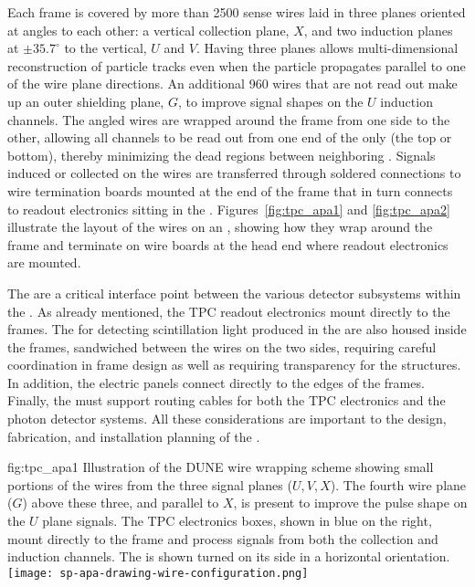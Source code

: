Each  frame is covered by more than \num{2500} sense wires laid in three planes  oriented at angles to each other: a vertical collection plane, $X$, and two induction planes at $\pm35.7^\circ$ to the vertical, $U$ and $V$. Having three planes allows multi-dimensional reconstruction of particle tracks even when the particle propagates parallel to one of the wire plane directions.  An additional \num{960} wires that are not read out make up an outer shielding plane, $G$, to improve signal shapes on the $U$ induction channels.  The angled wires are wrapped around the frame from one side to the other, allowing all channels to be read out from one end of the  only (the top or bottom), thereby minimizing the dead regions between neighboring . Signals induced or collected on the wires are transferred through soldered connections to wire termination boards mounted at the end of the  frame that in turn connects to  readout electronics sitting in the \lar.  Figures~\ref{fig:tpc_apa1} and \ref{fig:tpc_apa2} illustrate the layout of the wires on an , showing how they wrap around the frame and terminate on wire boards at the head end where readout electronics are mounted.

The  are a critical interface point between the various detector subsystems within the .  As already mentioned, the TPC readout electronics mount directly to the  frames.  The  for detecting scintillation light produced in the \lar are also housed inside the frames, sandwiched between the wires on the two sides, requiring careful coordination in frame design as well as requiring transparency for the  structures.  In addition, the electric  panels connect directly to the edges of the  frames.  Finally, the  must support routing cables for both the TPC electronics and the photon detector systems. All these considerations are important to the design, fabrication, and installation planning of the .

\begin{dunefigure}{fig:tpc_apa1}
{Illustration of the DUNE  wire wrapping scheme showing small portions of the wires from the three signal planes ($U,V,X$). The fourth wire plane ($G$) above these three, and parallel to $X$, is present to improve the pulse shape on the $U$ plane signals. The TPC electronics boxes, shown in blue on the right, mount directly to the frame and process signals from both the collection and induction channels. The  is shown turned on its side in a horizontal orientation.} 
\texttt{[image: sp-apa-drawing-wire-configuration.png]} 
\end{dunefigure} 

